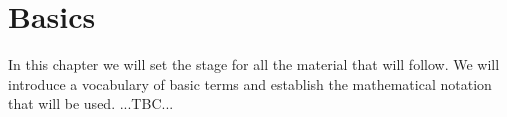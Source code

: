 \chapter{Basics}
In this chapter we will set the stage for all the material that will follow. We will introduce a vocabulary of basic terms and establish the mathematical notation that will be used. ...TBC...


